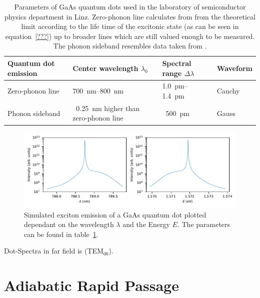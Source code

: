 \begin{table}[H]
	\caption[Paramters of GaAs quantum dots used in the laboratory of semiconductor physics department in Linz.]{Parameters of GaAs quantum dots used in the laboratory of semiconductor physics department in Linz.
	Zero-phonon line calculates from from the theoretical limit according to the life time of the excitonic state (as can be seen in equation~\eqref{???}) up to broader lines which are still valued enough to be measured.
	The phonon sideband resembles data taken from \textcite{scholl_resonance_2019}.}
	\label{tab:quantum-dot-emission}
	\begin{tabular}{@{}llll@{}}
		\toprule
		Quantum dot emission & Center wavelength $\lambda_0$           & Spectral range $\Delta \lambda$ & Waveform                  \\ \midrule
		Zero-phonon line               & \SIrange{700}{800}{\nano \metre} & \SIrange{1.0}{1.4}{\pico \metre} & Cauchy\\
		Phonon sideband       & ~\SI{0.25}{\nano \metre} higher than zero-phonon line  & ~\SI{500}{\pico \metre} & Gauss  \\ \bottomrule
	\end{tabular}
\end{table}

\begin{figure}[H]
	\centering
	\includegraphics[width=\linewidth]{figures/fabry-perot/plots/quantum_dot_emission_wavelength_energy}
	\caption[Simulated exciton emission of a GaAs quantum dot]{Simulated exciton emission of a GaAs quantum dot plotted dependant on the wavelength $\lambda$ and the Energy $E$.
	The parameters can be found in table~\ref{tab:quantum-dot-emission}.}
	\label{fig:quantumdotemissionwavelengthenergy}
\end{figure}


Dot-Spectra in far field is (TEM$_{00}$).


\section{Adiabatic Rapid Passage}

